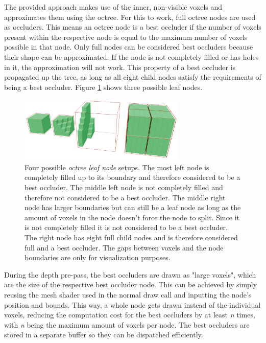 \noindent
The provided approach makes use of the inner, non-visible voxels and approximates them using the octree. For this 
to work, full octree nodes are used as occluders. This means an octree node is a best occluder if the number of 
voxels present within the respective node is equal to the maximum number of voxels possible in that node. Only full 
nodes can be considered best occluders because their shape can be approximated. If the node is not completely filled 
or has holes in it, the approximation will not work. This property of a best occluder is propagated up the tree, as 
long as all eight child nodes satisfy the requirements of being a best occluder. Figure 
\ref{fig:octreenode-filled-non-filled} shows three possible leaf nodes. 

\begin{figure}[h]
    \centering
    \includegraphics[width=300px]{images/graphics/octree-nodes-filled.jpg}
    \caption{Four possible \emph{octree leaf node} setups. The most left node is completely filled up to its 
    boundary and therefore considered to be a best occluder. The middle left node is not completely filled and therefore 
    not considered to be a best occluder. The middle right node has larger boundaries but can still be a leaf node as long 
    as the amount of voxels in the node doesn't force the node to split. Since it is not completely filled it is not 
    considered to be a best occluder. The right node has eight full child nodes and is therefore considered full and a best occluder.
    The gaps between voxels and the node boundaries are only for visualization purposes.}
    \label{fig:octreenode-filled-non-filled}
\end{figure}

\noindent
During the depth pre-pass, the best occluders are drawn as "large voxels", which are the size of the respective 
best occluder node. This can be achieved by simply reusing the mesh shader used in the normal draw call and 
inputting the node's position and bounds. This way, a whole node gets drawn instead of the individual voxels, 
reducing the computation cost for the best occluders by at least \emph{n} times, with \emph{n} being the maximum 
amount of voxels per node. The best occluders are stored in a separate buffer so they can be dispatched efficiently. \\

